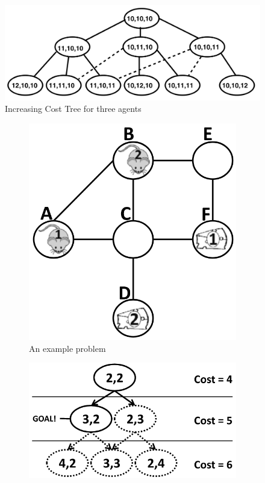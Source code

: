 \documentclass[english,10pt]{article}
\begin{document}
	\begin{figure}[t]
		\centering
		\includegraphics[width=0.5\linewidth]{img/ict}
		\caption{Increasing Cost Tree for three agents \cite{sharon2011}}
		\label{fig:ict}
		\vspace{-30pt}
	\end{figure}
	\begin{figure}
		
	\end{figure}
	
	
	\begin{figure}[b]
		\centering
		\begin{subfigure}{0.2\textwidth}
			\centering
			\includegraphics[width=\linewidth]{img/mdds1}
			\caption{An example problem}
			\label{fig:problem}
		\end{subfigure}
		\hfill
		\begin{subfigure}{0.3\textwidth}
			\centering
			\includegraphics[width=\linewidth]{img/ict2}

\end{subfigure}
\end{figure}
\end{document}
